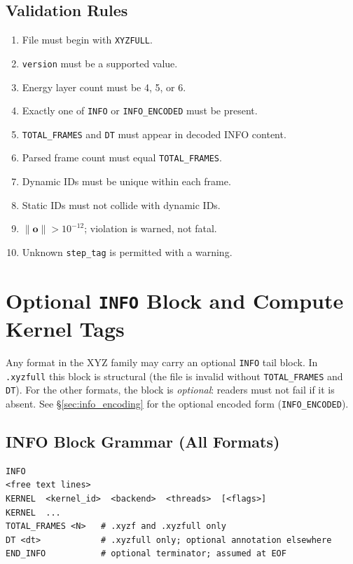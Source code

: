 \documentclass[12pt, a4paper, oneside]{article}
\begin{document}
\subsection{Validation Rules}

\begin{enumerate}
  \item File must begin with \texttt{XYZFULL}.
  \item \texttt{version} must be a supported value.
  \item Energy layer count must be 4, 5, or 6.
  \item Exactly one of \texttt{INFO} or \texttt{INFO\_ENCODED} must be present.
  \item \texttt{TOTAL\_FRAMES} and \texttt{DT} must appear in decoded INFO content.
  \item Parsed frame count must equal \texttt{TOTAL\_FRAMES}.
  \item Dynamic IDs must be unique within each frame.
  \item Static IDs must not collide with dynamic IDs.
  \item $\|\mathbf{o}\| > 10^{-12}$; violation is warned, not fatal.
  \item Unknown \texttt{step\_tag} is permitted with a warning.
\end{enumerate}

\section{Optional \texttt{INFO} Block and Compute Kernel Tags}
\label{sec:info_kernels}

Any format in the XYZ family may carry an optional \texttt{INFO} tail block.
In \texttt{.xyzfull} this block is structural (the file is invalid without
\texttt{TOTAL\_FRAMES} and \texttt{DT}).  For the other formats, the block
is \emph{optional}: readers must not fail if it is absent.
See \S\ref{sec:info_encoding} for the optional encoded form (\texttt{INFO\_ENCODED}).

\subsection{INFO Block Grammar (All Formats)}

\begin{lstlisting}[language={},frame=single]
INFO
<free text lines>
KERNEL  <kernel_id>  <backend>  <threads>  [<flags>]
KERNEL  ...
TOTAL_FRAMES <N>   # .xyzf and .xyzfull only
DT <dt>            # .xyzfull only; optional annotation elsewhere
END_INFO           # optional terminator; assumed at EOF
\end{lstlisting}
\end{document}
